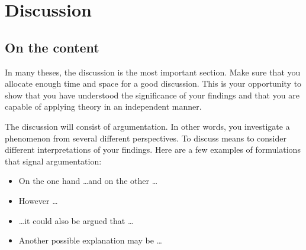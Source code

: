 \chapter{Discussion}
\label{chp:discussion}
\section{On the content}
In many theses, the discussion is the most important section. Make sure that you allocate enough time and space for a good discussion. This is your opportunity to show that you have understood the significance of your findings and that you are capable of applying theory in an independent manner.

The discussion will consist of argumentation. In other words, you investigate a phenomenon from several different perspectives. To discuss means to consider different interpretations of your findings. Here are a few examples of formulations that signal argumentation:

\begin{itemize}
    \item On the one hand \dots and on the other \dots 
    \item However \dots
    \item \dots it could also be argued that \dots
    \item Another possible explanation may be \dots
\end{itemize}


